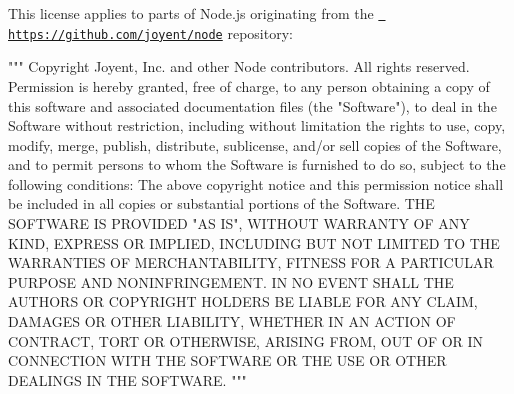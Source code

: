 \begin{DoxyItemize}
This license applies to parts of Node.\+js originating from the \href{https://github.com/joyent/node}{\texttt{ https\+://github.\+com/joyent/node}} repository\+:

"{}"{}"{}   Copyright Joyent, Inc. and other Node contributors. All rights reserved.   Permission is hereby granted, free of charge, to any person obtaining a copy   of this software and associated documentation files (the "{}Software"{}), to   deal in the Software without restriction, including without limitation the   rights to use, copy, modify, merge, publish, distribute, sublicense, and/or   sell copies of the Software, and to permit persons to whom the Software is   furnished to do so, subject to the following conditions\+:    The above copyright notice and this permission notice shall be included in   all copies or substantial portions of the Software.    THE SOFTWARE IS PROVIDED "{}AS IS"{}, WITHOUT WARRANTY OF ANY KIND, EXPRESS OR   IMPLIED, INCLUDING BUT NOT LIMITED TO THE WARRANTIES OF MERCHANTABILITY,   FITNESS FOR A PARTICULAR PURPOSE AND NONINFRINGEMENT. IN NO EVENT SHALL THE   AUTHORS OR COPYRIGHT HOLDERS BE LIABLE FOR ANY CLAIM, DAMAGES OR OTHER   LIABILITY, WHETHER IN AN ACTION OF CONTRACT, TORT OR OTHERWISE, ARISING   FROM, OUT OF OR IN CONNECTION WITH THE SOFTWARE OR THE USE OR OTHER DEALINGS   IN THE SOFTWARE.   "{}"{}"{} 
\end{DoxyItemize}